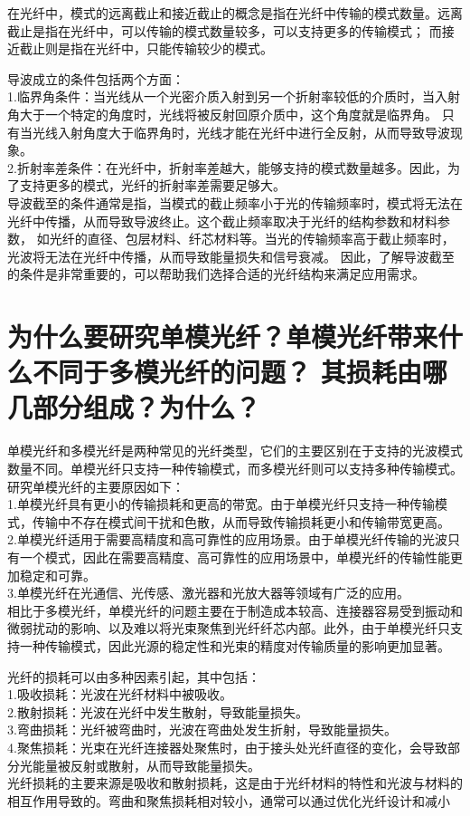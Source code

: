\documentclass[12pt, a4paper, oneside]{article}
\begin{document}
\begin{spacing}{2.0}
在光纤中，模式的远离截止和接近截止的概念是指在光纤中传输的模式数量。远离截止是指在光纤中，可以传输的模式数量较多，可以支持更多的传输模式；
而接近截止则是指在光纤中，只能传输较少的模式。

导波成立的条件包括两个方面：
\\
1.临界角条件：当光线从一个光密介质入射到另一个折射率较低的介质时，当入射角大于一个特定的角度时，光线将被反射回原介质中，这个角度就是临界角。
只有当光线入射角度大于临界角时，光线才能在光纤中进行全反射，从而导致导波现象。
\\
2.折射率差条件：在光纤中，折射率差越大，能够支持的模式数量越多。因此，为了支持更多的模式，光纤的折射率差需要足够大。
\\
导波截至的条件通常是指，当模式的截止频率小于光的传输频率时，模式将无法在光纤中传播，从而导致导波终止。这个截止频率取决于光纤的结构参数和材料参数，
如光纤的直径、包层材料、纤芯材料等。当光的传输频率高于截止频率时，光波将无法在光纤中传播，从而导致能量损失和信号衰减。
因此，了解导波截至的条件是非常重要的，可以帮助我们选择合适的光纤结构来满足应用需求。


\section{为什么要研究单模光纤？单模光纤带来什么不同于多模光纤的问题？ 其损耗由哪几部分组成？为什么？}

单模光纤和多模光纤是两种常见的光纤类型，它们的主要区别在于支持的光波模式数量不同。单模光纤只支持一种传输模式，而多模光纤则可以支持多种传输模式。
研究单模光纤的主要原因如下：
\\
1.单模光纤具有更小的传输损耗和更高的带宽。由于单模光纤只支持一种传输模式，传输中不存在模式间干扰和色散，从而导致传输损耗更小和传输带宽更高。
\\
2.单模光纤适用于需要高精度和高可靠性的应用场景。由于单模光纤传输的光波只有一个模式，因此在需要高精度、高可靠性的应用场景中，单模光纤的传输性能更加稳定和可靠。
\\
3.单模光纤在光通信、光传感、激光器和光放大器等领域有广泛的应用。
\\
相比于多模光纤，单模光纤的问题主要在于制造成本较高、连接器容易受到振动和微弱扰动的影响、以及难以将光束聚焦到光纤纤芯内部。此外，由于单模光纤只支持一种传输模式，因此光源的稳定性和光束的精度对传输质量的影响更加显著。

光纤的损耗可以由多种因素引起，其中包括：
\\
1.吸收损耗：光波在光纤材料中被吸收。
\\
2.散射损耗：光波在光纤中发生散射，导致能量损失。
\\
3.弯曲损耗：光纤被弯曲时，光波在弯曲处发生折射，导致能量损失。
\\
4.聚焦损耗：光束在光纤连接器处聚焦时，由于接头处光纤直径的变化，会导致部分光能量被反射或散射，从而导致能量损失。
\\
光纤损耗的主要来源是吸收和散射损耗，这是由于光纤材料的特性和光波与材料的相互作用导致的。弯曲和聚焦损耗相对较小，通常可以通过优化光纤设计和减小





\end{spacing}
\end{document}
